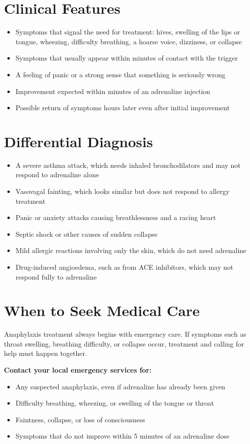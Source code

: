 \section*{Clinical Features}
\begin{itemize}
    \item Symptoms that signal the need for treatment: hives, swelling of the lips or tongue, wheezing, difficulty breathing, a hoarse voice, dizziness, or collapse
    \item Symptoms that usually appear within minutes of contact with the trigger
    \item A feeling of panic or a strong sense that something is seriously wrong
    \item Improvement expected within minutes of an adrenaline injection
    \item Possible return of symptoms hours later even after initial improvement
\end{itemize}

\section*{Differential Diagnosis}
\begin{itemize}
    \item A severe asthma attack, which needs inhaled bronchodilators and may not respond to adrenaline alone
    \item Vasovagal fainting, which looks similar but does not respond to allergy treatment
    \item Panic or anxiety attacks causing breathlessness and a racing heart
    \item Septic shock or other causes of sudden collapse
    \item Mild allergic reactions involving only the skin, which do not need adrenaline
    \item Drug-induced angioedema, such as from ACE inhibitors, which may not respond fully to adrenaline
\end{itemize}

\section*{When to Seek Medical Care}
Anaphylaxis treatment always begins with emergency care. If symptoms such as throat swelling, breathing difficulty, or collapse occur, treatment and calling for help must happen together.

\textbf{Contact your local emergency services for:}
\begin{itemize}
    \item Any suspected anaphylaxis, even if adrenaline has already been given
    \item Difficulty breathing, wheezing, or swelling of the tongue or throat
    \item Faintness, collapse, or loss of consciousness
    \item Symptoms that do not improve within 5 minutes of an adrenaline dose
\end{itemize}

